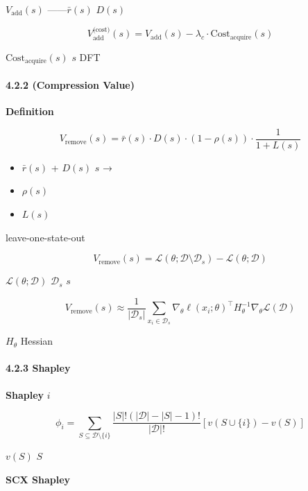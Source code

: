 \documentclass[
  12pt,
]{article}
\providecommand{\tightlist}{%
  \setlength{\itemsep}{0pt}\setlength{\parskip}{0pt}}
\begin{document}
\textbf{}\(V_{\text{add}}(s)\)
------\(\bar{r}(s)\) \(D(s)\)


\textbf{}

\[
V_{\text{add}}^{\text{(cost)}}(s) = V_{\text{add}}(s) - \lambda_c \cdot \text{Cost}_{\text{acquire}}(s)
\]

 \(\text{Cost}_{\text{acquire}}(s)\)  \(s\)
 DFT 

\paragraph{4.2.2  (Compression
Value)}\label{ux538bux7f29ux4ef7ux503c-compression-value}

\textbf{Definition}

\[
V_{\text{remove}}(s) = \bar{r}(s) \cdot D(s) \cdot (1 - \rho(s)) \cdot \frac{1}{1 + L(s)}
\]

\begin{itemize}
\tightlist
\item
   \(\bar{r}(s)\) +  \(D(s)\) \(s\)  →
  
\item
   \(\rho(s)\)
\item
   \(L(s)\)
\end{itemize}

\textbf{}

 leave-one-state-out 

\[
V_{\text{remove}}(s) = \mathcal{L}(\theta; \mathcal{D} \setminus \mathcal{D}_s) - \mathcal{L}(\theta; \mathcal{D})
\]

 \(\mathcal{L}(\theta; \mathcal{D})\)
\(\mathcal{D}_s\)  \(s\) 



\[
V_{\text{remove}}(s) \approx \frac{1}{|\mathcal{D}_s|} \sum_{x_i \in \mathcal{D}_s} \nabla_\theta \ell(x_i; \theta)^\top H_\theta^{-1} \nabla_\theta \mathcal{L}(\mathcal{D})
\]

 \(H_\theta\)  Hessian 

\paragraph{4.2.3  Shapley
}\label{ux4e0e-shapley-ux503cux7684ux5173ux7cfb}

\textbf{Shapley } \(i\) 

\[
\phi_i = \sum_{S \subseteq \mathcal{D} \setminus \{i\}} \frac{|S|!(|\mathcal{D}| - |S| - 1)!}{|\mathcal{D}|!} [v(S \cup \{i\}) - v(S)]
\]

 \(v(S)\)  \(S\) 

\textbf{SCX  Shapley }
\end{document}
